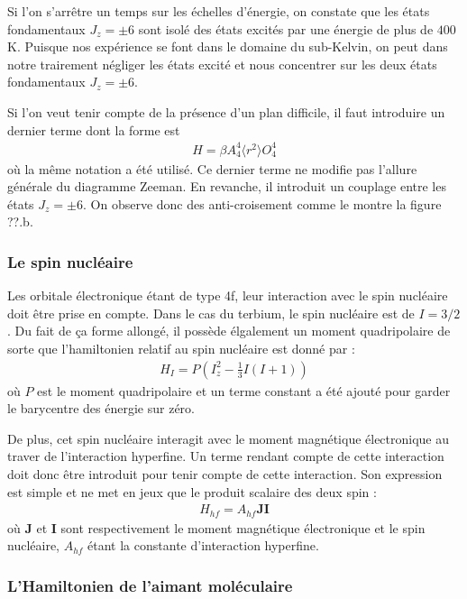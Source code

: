 Si l'on s'arr\^etre un temps sur les échelles d'énergie, on constate que les états fondamentaux $J_z = \pm 6$ sont isolé des états excités par une énergie de plus de $400$\,K. Puisque nos expérience se font dans le domaine du sub-Kelvin, on peut dans notre trairement négliger les états excité et nous concentrer sur les deux états fondamentaux  $J_z = \pm 6$.

Si l'on veut tenir compte de la présence d'un plan difficile, il faut introduire un dernier terme dont la forme est
\begin{eqnarray}
H = \beta A_4^4 \langle r^2 \rangle O_4^4
\end{eqnarray}
où la m\^eme notation a été utilisé. Ce dernier terme ne modifie pas l'allure générale du diagramme Zeeman. En revanche, il introduit un couplage entre les états  $J_z = \pm 6$. On observe donc des anti-croisement comme le montre la figure ??.b.

\subsubsection{Le spin nucléaire}
Les orbitale électronique étant de type 4f, leur interaction avec le spin nucléaire doit \^etre prise en compte. Dans le cas du terbium, le spin nucléaire est de $I = 3/2$. Du fait de ça forme allongé, il possède élgalement un moment quadripolaire de sorte que l'hamiltonien relatif au spin nucléaire est donné par :
\begin{eqnarray}
H_I = P\left(I_z^2 - \frac{1}{3}I(I+1)\right)
\end{eqnarray}
où $P$ est le moment quadripolaire et un terme constant a été ajouté pour garder le barycentre des énergie sur zéro.

De plus, cet spin nucléaire interagit avec le moment magnétique électronique au traver de l'interaction hyperfine. Un terme rendant compte de cette interaction doit donc \^etre introduit pour tenir compte de cette interaction. Son expression est simple et ne met en jeux que le produit scalaire des deux spin :
\begin{eqnarray}
H_{hf} = A_{hf}\mathbf{J}\mathbf{I}
\end{eqnarray}
où $\mathbf{J}$ et $\mathbf{I}$ sont respectivement le moment magnétique électronique et le spin nucléaire, $A_{hf}$ étant la constante d'interaction hyperfine.

\subsubsection{L'Hamiltonien de l'aimant moléculaire}

